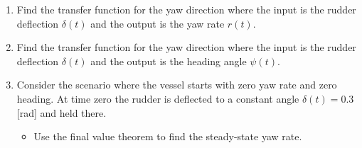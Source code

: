\documentclass[11pt]{article}
\begin{document}
\begin{enumerate}[resume]
\item Find the transfer function for the yaw direction where the input is the rudder deflection $\delta(t)$ and the output is the yaw rate $r(t)$.

\item Find the transfer function for the yaw direction where the input is the rudder deflection $\delta(t)$ and the output is the heading angle $\psi(t)$.

\item Consider the scenario where the vessel starts with zero yaw rate and zero heading.  At time zero the rudder is deflected to a constant angle $\delta(t) = 0.3$ [rad] and held there.
  \begin{itemize}[nosep]
    \item Use the final value theorem to find the steady-state yaw rate.
  \end{itemize}

\end{enumerate}
\end{document}
